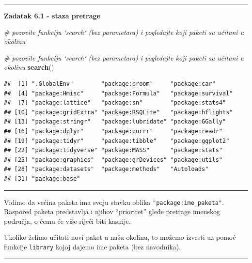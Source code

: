 \documentclass[]{book}
\newenvironment{Shaded}{\begin{snugshade}}{\end{snugshade}}
\newcommand{\KeywordTok}[1]{\textcolor[rgb]{0.13,0.29,0.53}{\textbf{#1}}}
\newcommand{\CommentTok}[1]{\textcolor[rgb]{0.56,0.35,0.01}{\textit{#1}}}
\newcommand{\NormalTok}[1]{#1}
\theoremstyle{definition}
\theoremstyle{definition}
\theoremstyle{definition}
\theoremstyle{remark}
\begin{document}
\begin{center}\rule{0.5\linewidth}{\linethickness}\end{center}

\textbf{Zadatak 6.1 - staza pretrage}

\begin{Shaded}
\begin{Highlighting}[]
\CommentTok{# pozovite funkciju `search` (bez parametara) i pogledajte koji paketi su učitani u okolinu}
\end{Highlighting}
\end{Shaded}

\begin{Shaded}
\begin{Highlighting}[]
\CommentTok{# pozovite funkciju `search` (bez parametara) i pogledajte koji paketi su učitani u okolinu}
\KeywordTok{search}\NormalTok{()}
\end{Highlighting}
\end{Shaded}

\begin{verbatim}
##  [1] ".GlobalEnv"        "package:broom"     "package:car"      
##  [4] "package:Hmisc"     "package:Formula"   "package:survival" 
##  [7] "package:lattice"   "package:sn"        "package:stats4"   
## [10] "package:gridExtra" "package:RSQLite"   "package:hflights" 
## [13] "package:stringr"   "package:lubridate" "package:GGally"   
## [16] "package:dplyr"     "package:purrr"     "package:readr"    
## [19] "package:tidyr"     "package:tibble"    "package:ggplot2"  
## [22] "package:tidyverse" "package:MASS"      "package:stats"    
## [25] "package:graphics"  "package:grDevices" "package:utils"    
## [28] "package:datasets"  "package:methods"   "Autoloads"        
## [31] "package:base"
\end{verbatim}

\begin{center}\rule{0.5\linewidth}{\linethickness}\end{center}

Vidimo da većina paketa ima svoju stavku oblika
\texttt{"package:ime\_paketa"}. Raspored paketa predstavlja i njihov
``prioritet'' glede pretrage imenskog područja, o čemu će više riječi
biti kasnije.

Ukoliko želimo učitati novi paket u našu okolinu, to možemo izvesti uz
pomoć funkcije \texttt{library} kojoj dajemo ime paketa (bez navodnika).

\begin{center}\rule{0.5\linewidth}{\linethickness}\end{center}
\end{document}
